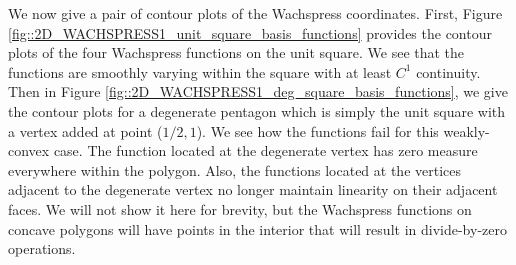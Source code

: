 We now give a pair of contour plots of the Wachspress coordinates. First, Figure \ref{fig::2D_WACHSPRESS1_unit_square_basis_functions} provides the contour plots of the four Wachspress functions on the unit square. We see that the functions are smoothly varying within the square with at least $C^1$ continuity. Then in Figure \ref{fig::2D_WACHSPRESS1_deg_square_basis_functions}, we give the contour plots for a degenerate pentagon which is simply the unit square with a vertex added at point ($1/2,1$). We see how the functions fail for this weakly-convex case. The function located at the degenerate vertex has zero measure everywhere within the polygon. Also, the functions located at the vertices adjacent to the degenerate vertex no longer maintain linearity on their adjacent faces. We will not show it here for brevity, but the Wachspress functions on concave polygons will have points in the interior that will result in divide-by-zero operations.

